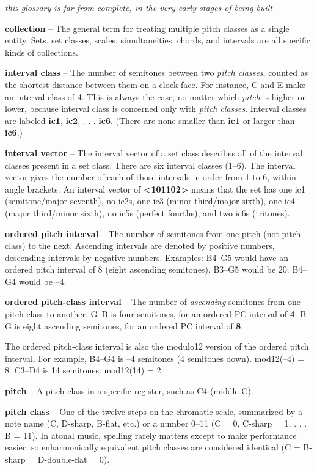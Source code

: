 \documentclass{book}
\begin{document}
\emph{this glossary is far from complete, in the very early stages of being
built}

\textbf{collection} -- The general term for treating multiple pitch classes as
a single entity. Sets, set classes, scales, simultaneities, chords, and
intervals are all specific kinds of collections.

\textbf{interval class} -- The number of semitones between two \emph{pitch
classes}, counted as the shortest distance between them on a clock face. For
instance, C and E make an interval class of 4. This is always the case, no
matter which \emph{pitch} is higher or lower, because interval class is
concerned only with \emph{pitch classes}. Interval classes are labeled
\textbf{ic1}, \textbf{ic2}, . . . \textbf{ic6}. (There are none smaller than
\textbf{ic1} or larger than \textbf{ic6}.)

\textbf{interval vector} -- The interval vector of a set class describes all
of the interval classes present in a set class. There are six interval classes
(1--6). The interval vector gives the number of each of those intervals in
order from 1 to 6, within angle brackets. An interval vector of
\textbf{\textless101102\textgreater{}} means that the set has one ic1
(semitone/major seventh), no ic2s, one ic3 (minor third/major sixth), one ic4
(major third/minor sixth), no ic5s (perfect fourths), and two ic6s (tritones).

\textbf{ordered pitch interval} -- The number of semitones from one pitch (not
pitch class) to the next. Ascending intervals are denoted by positive numbers,
descending intervals by negative numbers. Examples: B4--G5 would have an
ordered pitch interval of 8 (eight ascending semitones). B3--G5 would be 20.
B4--G4 would be --4.

\textbf{ordered pitch-class interval} -- The number of \emph{ascending}
semitones from one pitch-class to another. G--B is four semitones, for an
ordered PC interval of \textbf{4}. B--G is eight ascending semitones, for an
ordered PC interval of \textbf{8}.

The ordered pitch-class interval is also the modulo12 version of the ordered
pitch interval. For example, B4--G4 is --4 semitones (4 semitones down).
mod12(--4) = 8. C3--D4 is 14 semitones. mod12(14) = 2.

\textbf{pitch} -- A pitch class in a specific register, such as C4 (middle C).

\textbf{pitch class} -- One of the twelve steps on the chromatic scale,
summarized by a note name (C, D-sharp, B-flat, etc.) or a number 0--11 (C = 0,
C-sharp = 1, . . . B = 11). In atonal music, spelling rarely matters except to
make performance easier, so enharmonically equivalent pitch classes are
considered identical (C = B-sharp = D-double-flat = 0).
\end{document}
